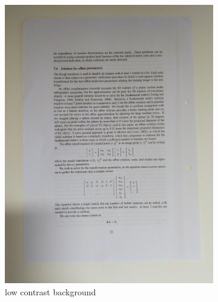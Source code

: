 \documentclass[bibliography=totoc]{scrartcl}
\begin{document}
\begin{figure}[H]
	\centering
	\begin{subfigure}[t]{0.3\linewidth}
		\includegraphics[width=\linewidth]{imgs/not_working/white_background.jpg}
		\caption{low contrast background}
		\label{subfig:white_background}
	\end{subfigure}
	\hspace{0.02\textwidth}
	\begin{subfigure}[t]{0.3\linewidth}

\end{subfigure}
\end{figure}
\end{document}
